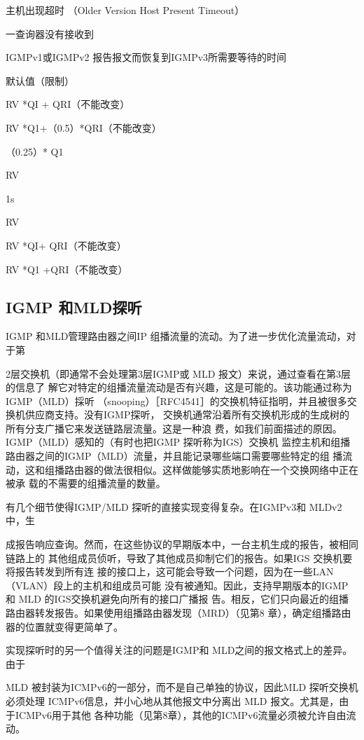 主机出现超时 （Older Version Host Present Timeout）

一查询器没有接收到

IGMPv1或IGMPv2 报告报文而恢复到IGMPv3所需要等待的时间

默认值（限制）

RV *QI + QRI（不能改变）

RV *Q1+（0.5）*QRI（不能改变）

（0.25）* Q1

RV

1s

RV

RV *QI+ QRI（不能改变）

RV *Q1 +QRI（不能改变）

\subsection{IGMP 和MLD探听}
IGMP 和MLD管理路由器之间IP 组播流量的流动。为了进一步优化流量流动，对于第

2层交换机（即通常不会处理第3层IGMP或 MLD 报文）来说，通过查看在第3层的信息了
解它对特定的组播流量流动是否有兴趣，这是可能的。该功能通过称为 IGMP（MLD）採听
（snooping）［RFC4541］的交换机特征指明，并且被很多交换机供应商支持。没有IGMP探听，
交换机通常沿着所有交换机形成的生成树的所有分支广播它来发送链路层流量。这是一种浪
费，如我们前面描述的原因。IGMP（MLD）感知的（有时也把IGMP 探听称为IGS）交换机
监控主机和组播路由器之间的IGMP（MLD）流量，并且能记录哪些端口需要哪些特定的组
播流动，这和组播路由器的做法很相似。这样做能够实质地影响在一个交换网络中正在被承
载的不需要的组播流量的数量。

有几个细节使得IGMP/MLD 探听的直接实现变得复杂。在IGMPv3和 MLDv2中，生

成报告响应查询。然而，在这些协议的早期版本中，一台主机生成的报告，被相同链路上的
其他组成员侦听，导致了其他成员抑制它们的报告。如果IGS 交换机要将报告转发到所有连
接的接口上，这可能会导致一个问题，因为在一些LAN（VLAN）段上的主机和组成员可能
没有被通知。因此，支持早期版本的IGMP 和 MLD 的IGS交换机避免向所有的接口广播报
告。相反，它们只向最近的组播路由器转发报告。如果使用组播路由器发现（MRD）（见第8
章），确定组播路由器的位置就变得更简单了。

实现探听时的另一个值得关注的问题是IGMP和 MLD之间的报文格式上的差异。由于

MLD 被封装为ICMPv6的一部分，而不是自己单独的协议，因此MLD 探听交换机必须处理
ICMPv6信息，并小心地从其他报文中分离出 MLD 报文。尤其是，由于ICMPv6用于其他
各种功能（见第8章），其他的ICMPv6流量必须被允许自由流动。


